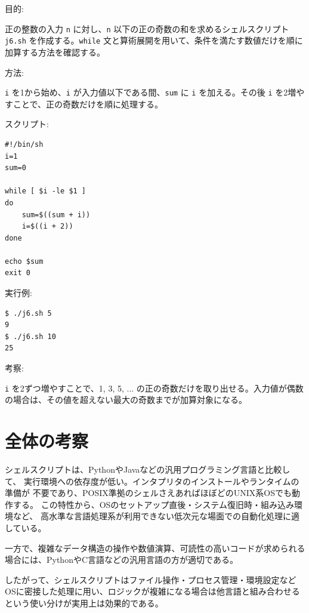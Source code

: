 \documentclass[12pt,a4paper]{jsarticle}
\begin{document}
目的:\par
正の整数の入力 \texttt{n} に対し、\texttt{n} 以下の正の奇数の和を求めるシェルスクリプト \texttt{j6.sh} を作成する。\texttt{while} 文と算術展開を用いて、条件を満たす数値だけを順に加算する方法を確認する。

方法:\par
\texttt{i} を1から始め、\texttt{i} が入力値以下である間、\texttt{sum} に \texttt{i} を加える。その後 \texttt{i} を2増やすことで、正の奇数だけを順に処理する。

スクリプト:\par
\begin{lstlisting}
#!/bin/sh
i=1
sum=0

while [ $i -le $1 ]
do
    sum=$((sum + i))
    i=$((i + 2))
done

echo $sum
exit 0
\end{lstlisting}

実行例:\par
\begin{lstlisting}
$ ./j6.sh 5
9
$ ./j6.sh 10
25
\end{lstlisting}

考察:\par
\texttt{i} を2ずつ増やすことで、1, 3, 5, ... の正の奇数だけを取り出せる。入力値が偶数の場合は、その値を超えない最大の奇数までが加算対象になる。\par

\vspace{1cm}

\section*{全体の考察}

シェルスクリプトは、PythonやJavaなどの汎用プログラミング言語と比較して、
実行環境への依存度が低い。インタプリタのインストールやランタイムの準備が
不要であり、POSIX準拠のシェルさえあればほぼどのUNIX系OSでも動作する。
この特性から、OSのセットアップ直後・システム復旧時・組み込み環境など、
高水準な言語処理系が利用できない低次元な場面での自動化処理に適している。

一方で、複雑なデータ構造の操作や数値演算、可読性の高いコードが求められる
場合には、PythonやC言語などの汎用言語の方が適切である。

したがって、シェルスクリプトはファイル操作・プロセス管理・環境設定など
OSに密接した処理に用い、ロジックが複雑になる場合は他言語と組み合わせる
という使い分けが実用上は効果的である。


\vspace{1cm}
\end{document}
